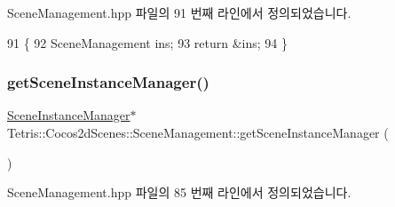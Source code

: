 Scene\+Management.\+hpp 파일의 91 번째 라인에서 정의되었습니다.


\begin{DoxyCode}
91                                              \{
92             SceneManagement ins;
93             \textcolor{keywordflow}{return} &ins;
94         \}
\end{DoxyCode}
\mbox{\label{class_tetris_1_1_cocos2d_scenes_1_1_scene_management_a4a4ea58177afffd49857182c961eb5f3}} 
\subsubsection{\texorpdfstring{get\+Scene\+Instance\+Manager()}{getSceneInstanceManager()}}
{\footnotesize\ttfamily \hyperlink{class_tetris_1_1_cocos2d_scenes_1_1_scene_instance_manager}{Scene\+Instance\+Manager}$\ast$ Tetris\+::\+Cocos2d\+Scenes\+::\+Scene\+Management\+::get\+Scene\+Instance\+Manager (\begin{DoxyParamCaption}{ }\end{DoxyParamCaption})\hspace{0.3cm}{\ttfamily [inline]}}



Scene\+Management.\+hpp 파일의 85 번째 라인에서 정의되었습니다.


